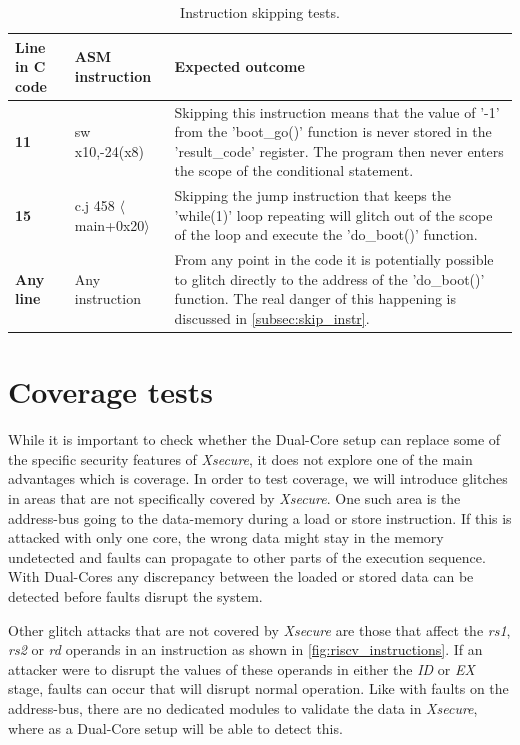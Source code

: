 \begin{table}[h]
\centering
\caption{Instruction skipping tests.}
\label{tab:instr_skip_test}
\begin{tabular}{m{2.5cm}m{3.5cm}m{7.5cm}}
\toprule 
Line in C code & ASM instruction & Expected outcome \\
\midrule
\rowcolor{black!20} \textbf{11} & sw x10,-24(x8) & Skipping this instruction means that the value of '-1' from the 'boot\_go()' function is never stored in the 'result\_code' register. The program then never enters the scope of the conditional statement. \\
\textbf{15} & c.j 458 $\langle$main+0x20$\rangle$ & Skipping the jump instruction that keeps the 'while(1)' loop repeating will glitch out of the scope of the loop and execute the 'do\_boot()' function.  \\
\rowcolor{black!20} \textbf{Any line} & Any instruction & From any point in the code it is potentially possible to glitch directly to the address of the 'do\_boot()' function. The real danger of this happening is discussed in \autoref{subsec:skip_instr}. \\
\bottomrule
\end{tabular}
\end{table}

\section{Coverage tests}
\label{sec:coverage_test}

While it is important to check whether the Dual-Core setup can replace some of the specific security features of \textit{Xsecure}, it does not explore one of the main advantages which is coverage. In order to test coverage, we will introduce glitches in areas that are not specifically covered by \textit{Xsecure}. One such area is the address-bus going to the data-memory during a load or store instruction. If this is attacked with only one core, the wrong data might stay in the memory undetected and faults can propagate to other parts of the execution sequence. With Dual-Cores any discrepancy between the loaded or stored data can be detected before faults disrupt the system. 

Other glitch attacks that are not covered by \textit{Xsecure} are those that affect the \textit{rs1}, \textit{rs2} or \textit{rd} operands in an instruction as shown in \autoref{fig:riscv_instructions}. If an attacker were to disrupt the values of these operands in either the \textit{ID} or \textit{EX} stage, faults can occur that will disrupt normal operation. Like with faults on the address-bus, there are no dedicated modules to validate the data in \textit{Xsecure}, where as a Dual-Core setup will be able to detect this.

